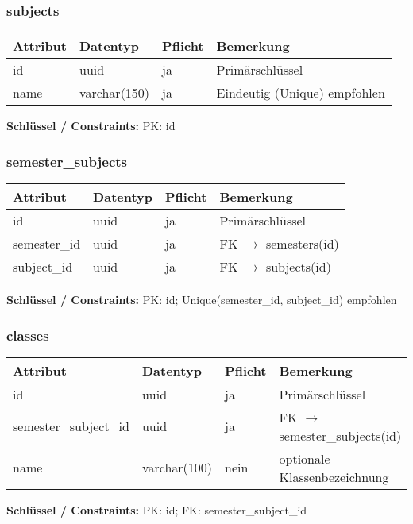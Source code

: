 \documentclass[12pt,a4paper]{article}
\begin{document}
    \subsubsection{subjects}
    \begin{longtable}{|L{4cm}|L{3cm}|L{3cm}|L{4cm}|}
        \hline
        \textbf{Attribut} & \textbf{Datentyp} & \textbf{Pflicht} & \textbf{Bemerkung} \\ \hline
        id & uuid & ja & Primärschlüssel \\ \hline
        name & varchar(150) & ja & Eindeutig (Unique) empfohlen \\ \hline
    \end{longtable}
    \textbf{Schlüssel / Constraints:} PK: id

    \subsubsection{semester\_subjects}
    \begin{longtable}{|L{4cm}|L{3cm}|L{3cm}|L{4cm}|}
        \hline
        \textbf{Attribut} & \textbf{Datentyp} & \textbf{Pflicht} & \textbf{Bemerkung} \\ \hline
        id & uuid & ja & Primärschlüssel \\ \hline
        semester\_id & uuid & ja & FK $\rightarrow$ semesters(id) \\ \hline
        subject\_id & uuid & ja & FK $\rightarrow$ subjects(id) \\ \hline
    \end{longtable}
    \textbf{Schlüssel / Constraints:} PK: id; Unique(semester\_id, subject\_id) empfohlen

    \subsubsection{classes}
    \begin{longtable}{|L{4cm}|L{3cm}|L{3cm}|L{4cm}|}
        \hline
        \textbf{Attribut} & \textbf{Datentyp} & \textbf{Pflicht} & \textbf{Bemerkung} \\ \hline
        id & uuid & ja & Primärschlüssel \\ \hline
        semester\_subject\_id & uuid & ja & FK $\rightarrow$ semester\_subjects(id) \\ \hline
        name & varchar(100) & nein & optionale Klassenbezeichnung \\ \hline
    \end{longtable}
    \textbf{Schlüssel / Constraints:} PK: id; FK: semester\_subject\_id
\end{document}
